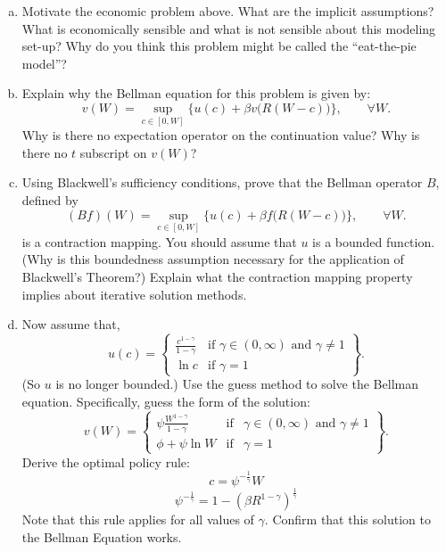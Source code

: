 \documentclass[11pt]{extarticle}
\theoremstyle{plain}
\theoremstyle{definition}
\begin{document}
\begin{enumerate}[(a)]
\item Motivate the economic problem above. What are the implicit assumptions? What is economically sensible and what is not sensible about this modeling set-up? Why do you think this problem might be called the ``eat-the-pie model''?

\item Explain why the Bellman equation for this problem is given by: 
\begin{equation*}
	v(W) = \sup_{c \in [0, W]} \Big\{u(c) + \beta v\Big(R(W-c)\Big) \Big\} , 
	\quad\quad \forall W.
\end{equation*}
Why is there no expectation operator on the continuation value? Why is there no $t$ subscript on $v(W)$?

\item Using Blackwell's sufficiency conditions, prove that the Bellman operator $B$, defined by
\begin{equation*}
	(Bf)(W) = \sup_{c \in [0, W]} \Big\{u(c) + \beta f\Big(R(W-c)\Big) \Big\} , 
	\quad\quad \forall W.
\end{equation*}
is a contraction mapping. You should assume that $u$ is a bounded function. (Why is this boundedness assumption necessary for the application of Blackwell's Theorem?) Explain what the contraction mapping property implies about iterative solution methods.

\item Now assume that, 
\begin{equation*}
u(c)=\left\{ 
\begin{array}{ll}
\frac{c^{1-\gamma }}{1-\gamma } & \text{if }\gamma \in (0,\infty )\text{ and 
}\gamma \neq 1 \\ 
\ln c & \text{if }\gamma =1%
\end{array}%
\right\} .
\end{equation*}%
(So $u$ is no longer bounded.) Use the guess method to solve the Bellman equation.  Specifically, guess the form of the solution: 
\begin{equation*}
v(W)=\left\{ 
\begin{array}{lll}
\psi \frac{W^{1-\gamma }}{1-\gamma } & \text{if} & \gamma \in (0,\infty )%
\text{ and }\gamma \neq 1 \\ 
\phi +\psi \ln W & \text{if} & \gamma =1%
\end{array}%
\right\} .
\end{equation*}%
Derive the optimal policy rule: 
\begin{equation*}
c=\psi ^{-\frac{1}{\gamma }}W
\end{equation*}%
\begin{equation*}
\psi ^{-\frac{1}{\gamma }}=1-(\beta R^{1-\gamma })^{\frac{1}{\gamma }}
\end{equation*}%
Note that this rule applies for all values of $\gamma .$ Confirm that this
solution to the Bellman Equation works.


\end{enumerate}
\end{document}
